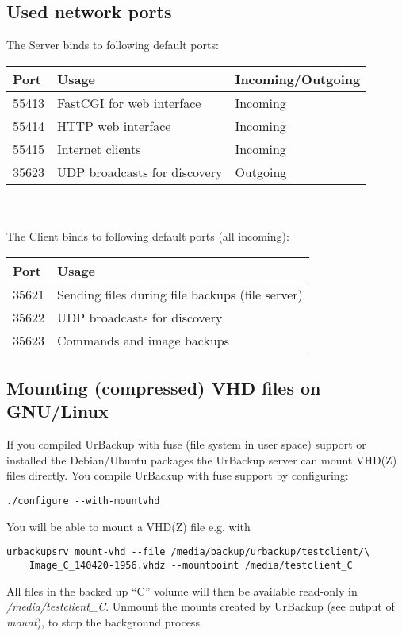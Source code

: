 \documentclass[a4paper,10pt]{article}
\begin{document}
\subsection{Used network ports}
\label{sec:ports}

The Server binds to following default ports:

\begin{tabular}{|p{}|p{}|p{}|}
\hline
\textbf{Port}  & \textbf{Usage} & \textbf{Incoming/Outgoing} \\
\hline
55413 & FastCGI for web interface & Incoming\\
\hline
55414 & HTTP web interface & Incoming\\
\hline
55415 & Internet clients & Incoming \\
\hline
35623 & UDP broadcasts for discovery & Outgoing\\
\hline
\end{tabular}\\\\

\noindent The Client binds to following default ports (all incoming):

\begin{tabular}{|p{}|p{}|}
\hline
\textbf{Port}  & \textbf{Usage} \\
\hline
35621 & Sending files during file backups (file server) \\
\hline
35622 & UDP broadcasts for discovery\\
\hline
35623 & Commands and image backups \\
\hline
\end{tabular}

\subsection{Mounting (compressed) VHD files on GNU/Linux}
\label{sec:mounting_image_files}

If you compiled UrBackup with fuse (file system in user space) support or
installed the Debian/Ubuntu packages the UrBackup server can mount 
VHD(Z) files directly. You compile UrBackup with fuse support by configuring:
\begin{verbatim}
./configure --with-mountvhd
\end{verbatim}
You will be able to mount a VHD(Z) file e.g. with
\begin{verbatim}
urbackupsrv mount-vhd --file /media/backup/urbackup/testclient/\
	Image_C_140420-1956.vhdz --mountpoint /media/testclient_C
\end{verbatim}
All files in the backed up ``C'' volume will then be available read-only in \textsl{/media/testclient\_C}.
Unmount the mounts created by UrBackup (see output of \textsl{mount}), to stop the background process.
\end{document}
